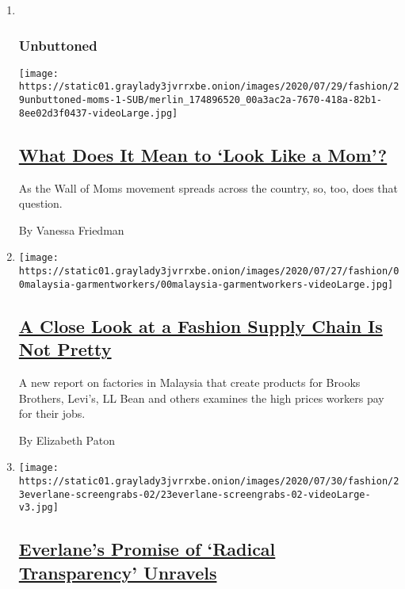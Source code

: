 \begin{enumerate}
\def\labelenumi{\arabic{enumi}.}
\item ~
  \hypertarget{unbuttoned}{%
  \subsubsection{Unbuttoned}\label{unbuttoned}}

  \texttt{[image: https://static01.graylady3jvrrxbe.onion/images/2020/07/29/fashion/29unbuttoned-moms-1-SUB/merlin\_174896520\_00a3ac2a-7670-418a-82b1-8ee02d3f0437-videoLarge.jpg]}

  \hypertarget{what-does-it-mean-to-look-like-a-mom}{%
  \subsection{\texorpdfstring{\href{/2020/07/28/style/wall-of-moms-image.html}{What
  Does It Mean to `Look Like a
  Mom'?}}{What Does It Mean to `Look Like a Mom'?}}\label{what-does-it-mean-to-look-like-a-mom}}

  As the Wall of Moms movement spreads across the country, so, too, does
  that question.

  By Vanessa Friedman
\item
  \texttt{[image: https://static01.graylady3jvrrxbe.onion/images/2020/07/27/fashion/00malaysia-garmentworkers/00malaysia-garmentworkers-videoLarge.jpg]}

  \hypertarget{a-close-look-at-a-fashion-supply-chain-is-not-pretty}{%
  \subsection{\texorpdfstring{\href{/2020/07/28/style/malaysia-forced-labor-garment-workers.html}{A
  Close Look at a Fashion Supply Chain Is Not
  Pretty}}{A Close Look at a Fashion Supply Chain Is Not Pretty}}\label{a-close-look-at-a-fashion-supply-chain-is-not-pretty}}

  A new report on factories in Malaysia that create products for Brooks
  Brothers, Levi's, LL Bean and others examines the high prices workers
  pay for their jobs.

  By Elizabeth Paton
\item
  \texttt{[image: https://static01.graylady3jvrrxbe.onion/images/2020/07/30/fashion/23everlane-screengrabs-02/23everlane-screengrabs-02-videoLarge-v3.jpg]}

  \hypertarget{everlanes-promise-of-radical-transparency-unravels}{%
  \subsection{\texorpdfstring{\href{/2020/07/26/fashion/everlane-employees-ethical-clothing.html}{Everlane's
  Promise of `Radical Transparency'
  Unravels}}{Everlane's Promise of `Radical Transparency' Unravels}}\label{everlanes-promise-of-radical-transparency-unravels}}


\end{enumerate}
